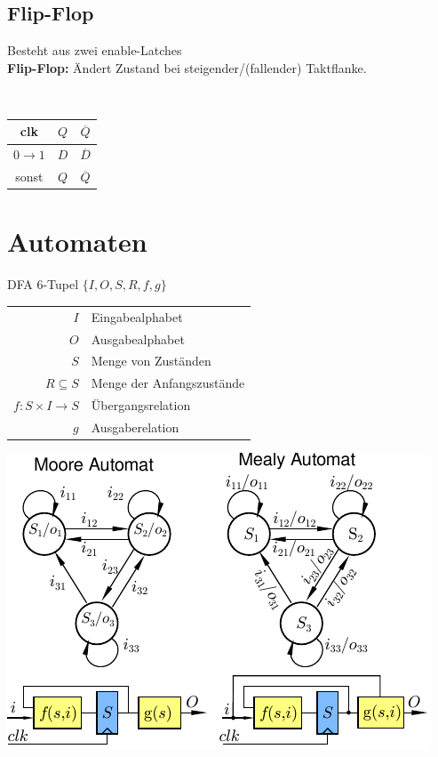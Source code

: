\documentclass[6pt,a4paper]{scrartcl}
\renewcommand{\emph}[1]{\textsf{\textbf{#1}}}
\newcommand{\eset}[1]{\ensuremath{\bigl\{#1\bigr\}}}								%
\newcommand{\ol}[1]{\ensuremath{\overline{#1}}}									%
\newcommand{\ra}[0]{\ensuremath{\rightarrow}} 									%
\begin{document}
\begin{multicols*}{3}
	\subsection{Flip-Flop}
		\parbox{5cm}{
			Besteht aus zwei enable-Latches \\
			\emph{Flip-Flop:} Ändert Zustand bei steigender/(fallender) Taktflanke.\\
		}
		\parbox{.5cm}{\ }
		\parbox{2cm}{
			\begin{tabular}{c|c|c} clk & $Q$ & $\ol Q$ \\ \hline $0 \ra 1$ & $D$ & $\ol D$ \\ sonst & $Q$ & $\ol Q$ \end{tabular}
		}


\section{Automaten} %

DFA 6-Tupel $\eset{I, O, S, R, f, g}$ \\

\begin{tabular}{r | l} 
$I$ & Eingabealphabet \\
$O$ &  Ausgabealphabet \\
$S$ & Menge von Zuständen \\
$R \subseteq S$ &  Menge der Anfangszustände \\
$f: S \times I \ra S$  &  Übergangsrelation \\
$g$ & Ausgaberelation \\
\end{tabular}

\includegraphics{./img/ds/automaten.pdf}\\



\end{multicols*}
\end{document}
